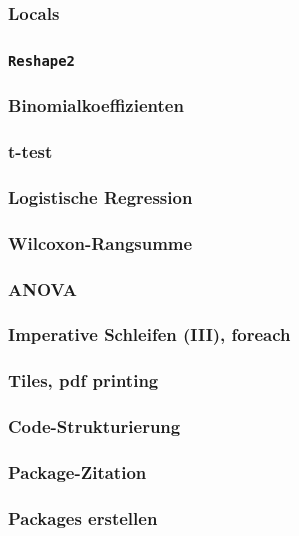 \documentclass[paper=A4, pagesize, DIV=calc, smallheadings,
fontsize=12pt, expansion=false]{scrreprt}
\begin{document}
\subsubsection*{Locals}

\subsubsection*{\texttt{Reshape2}}

\subsubsection*{Binomialkoeffizienten}

\subsubsection*{t-test}

\subsubsection{Logistische Regression}

\subsubsection{Wilcoxon-Rangsumme}

\subsubsection*{ANOVA}

\subsubsection{Imperative Schleifen (III), foreach}

\subsubsection{Tiles, pdf printing}

\subsubsection{Code-Strukturierung}

\subsubsection{Package-Zitation}

\subsubsection{Packages erstellen}
\end{document}
